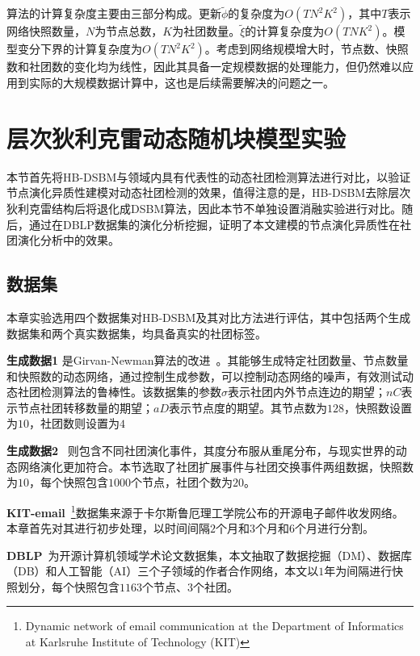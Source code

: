 算法的计算复杂度主要由三部分构成。更新$\widetilde{\phi}$的复杂度为$O(TN^2K^2)$，其中$T$表示网络快照数量，$N$为节点总数，$K$为社团数量。$\widetilde{\xi}$的计算复杂度为$O(TNK^2)$。模型变分下界的计算复杂度为$O(TN^2K^2)$。考虑到网络规模增大时，节点数、快照数和社团数的变化均为线性，因此其具备一定规模数据的处理能力，但仍然难以应用到实际的大规模数据计算中，这也是后续需要解决的问题之一。

\section{层次狄利克雷动态随机块模型实验}


本节首先将HB-DSBM与领域内具有代表性的动态社团检测算法进行对比，以验证节点演化异质性建模对动态社团检测的效果，值得注意的是，HB-DSBM去除层次狄利克雷结构后将退化成DSBM算法，因此本节不单独设置消融实验进行对比。随后，通过在DBLP数据集的演化分析挖掘，证明了本文建模的节点演化异质性在社团演化分析中的效果。


\subsection{数据集}

本章实验选用四个数据集对HB-DSBM及其对比方法进行评估，其中包括两个生成数据集和两个真实数据集，均具备真实的社团标签。

\textbf{生成数据1} 是Girvan-Newman算法的改进~\cite{lin2008facetnet}。其能够生成特定社团数量、节点数量和快照数的动态网络，通过控制生成参数，可以控制动态网络的噪声，有效测试动态社团检测算法的鲁棒性。该数据集的参数$\sigma$表示社团内外节点连边的期望；$nC$表示节点社团转移数量的期望；$aD$表示节点度的期望。其节点数为$128$，快照数设置为$10$，社团数则设置为$4$

\textbf{生成数据2} ~\cite{greene2010tracking}则包含不同社团演化事件，其度分布服从重尾分布，与现实世界的动态网络演化更加符合。本节选取了社团扩展事件与社团交换事件两组数据，快照数为$10$，每个快照包含$1000$个节点，社团个数为$20$。

\textbf{KIT-email}~\footnote{Dynamic network of email communication at the Department of Informatics at Karlsruhe Institute of Technology (KIT)}数据集来源于卡尔斯鲁厄理工学院公布的开源电子邮件收发网络。本章首先对其进行初步处理，以时间间隔$2$个月和$3$个月和$6$个月进行分割。

\textbf{DBLP}~\cite{konect:2017:dblp-cite}为开源计算机领域学术论文数据集，本文抽取了数据挖掘（DM）、数据库（DB）和人工智能（AI）三个子领域的作者合作网络，本文以$1$年为间隔进行快照划分，每个快照包含$1163$个节点、$3$个社团。


